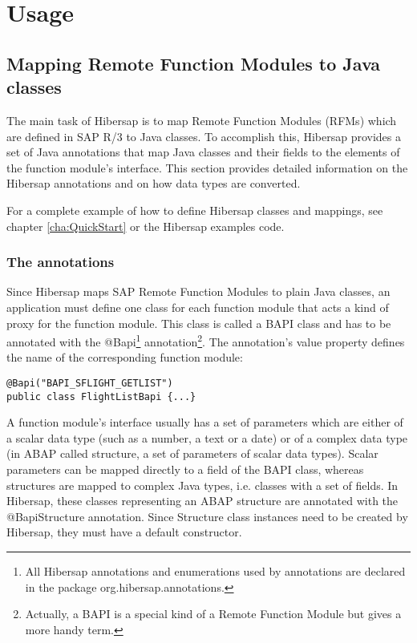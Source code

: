 \chapter{Usage}
\label{cha:Usage}

\section{Mapping Remote Function Modules to Java classes} 
\label{cha:Mapping}
The main task of Hibersap is to map Remote Function Modules (RFMs) which are defined in SAP R/3 to Java classes. To accomplish this, Hibersap provides a set of Java annotations that map Java classes and their fields to the elements of the function module's interface. This section provides detailed information on the Hibersap annotations and on how data types are converted.

For a complete example of how to define Hibersap classes and mappings, see chapter \ref{cha:QuickStart} or the Hibersap examples code.

\subsection{The annotations}
Since Hibersap maps SAP Remote Function Modules to plain Java classes, an application must define one class for each function module that acts a kind of proxy for the function module. This class is called a BAPI class and has to be annotated with the @Bapi\footnote{All Hibersap annotations and enumerations used by annotations are declared in the package org.hibersap.annotations.} annotation\footnote{Actually, a BAPI is a special kind of a Remote Function Module but gives a more handy term.}. The annotation's value property defines the name of the corresponding function module:

\begin{Verbatim}[frame=single]
@Bapi("BAPI_SFLIGHT_GETLIST") 
public class FlightListBapi {...}
\end{Verbatim}

A function module's interface usually has a set of parameters which are either of a scalar data type (such as a number, a text or a date) or of a complex data type (in ABAP called structure, a set of parameters of scalar data types). Scalar parameters can be mapped directly to a field of the BAPI class, whereas structures are mapped to complex Java types, i.e. classes with a set of fields. In Hibersap, these classes representing an ABAP structure are annotated with the @BapiStructure annotation. Since Structure class instances need to be created by Hibersap, they must have a default constructor.

